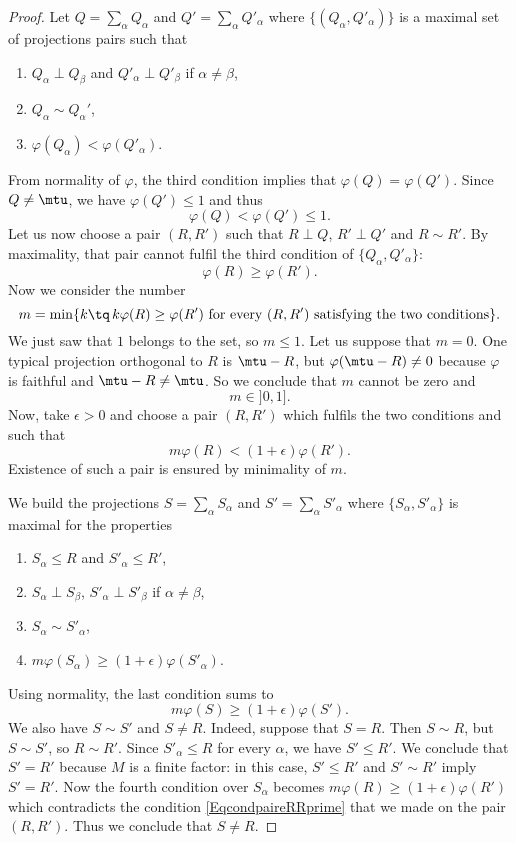 \begin{proof}
Let $Q=\sum_{\alpha}Q_{\alpha}$ and $Q'=\sum_{\alpha}Q'_{\alpha}$ where $\{ (Q_{\alpha},Q'_{\alpha}) \}$ is a maximal set of projections pairs such that
\begin{enumerate}
\item $Q_{\alpha}\perp Q_{\beta}$ and $Q'_{\alpha}\perp Q'_{\beta}$ if $\alpha\neq\beta$,
\item $Q_{\alpha}\sim Q_{\alpha}'$,
\item $\varphi(Q_{\alpha})<\varphi(Q'_{\alpha})$.
\end{enumerate}
From normality of $\varphi$, the third condition implies that $\varphi(Q)=\varphi(Q')$. Since $Q\neq\mtu$, we have $\varphi(Q')\leq 1$ and thus
\[ 
	\varphi(Q)<\varphi(Q')\leq 1.
\]
Let us now choose a pair $(R,R')$ such that $R\perp Q$, $R'\perp Q'$ and $R\sim R'$. By maximality, that pair cannot fulfil the third condition of $\{ Q_{\alpha},Q'_{\alpha} \}$:
\[ 
	\varphi(R)\geq \varphi(R').
\]
Now we consider the number
\begin{equation}
	m=\min\{ k\tq\, k\varphi(R)\geq\varphi(R')\text{ for every $(R,R')$ satisfying the two conditions} \}.
\end{equation}
We just saw that $1$ belongs to the set, so $m\leq 1$. Let us suppose that $m=0$. One typical projection orthogonal to $R$ is $\mtu-R$, but $\varphi(\mtu-R)\neq 0$ because $\varphi$ is faithful and $\mtu-R\neq\mtu$. So we conclude that $m$ cannot be zero and
\[ 
	m\in]0,1].
\]
Now, take $\epsilon>0$ and choose a pair $(R,R')$ which fulfils the two conditions and such that
\begin{equation}		\label{EqcondpaireRRprime}
	m\varphi(R)<(1+\epsilon)\varphi(R').
\end{equation}
Existence of such a pair is ensured by minimality of $m$.

We build the projections $S=\sum_{\alpha}S_{\alpha}$ and $S'=\sum_{\alpha}S'_{\alpha}$ where $\{ S_{\alpha},S'_{\alpha} \}$ is maximal for the properties
\begin{enumerate}
\item $S_{\alpha}\leq R$ and $S'_{\alpha}\leq R'$,
\item $S_{\alpha}\perp S_{\beta}$, $S'_{\alpha}\perp S'_{\beta}$ if $\alpha\neq\beta$,
\item $S_{\alpha}\sim S'_{\alpha}$,
\item $m\varphi(S_{\alpha})\geq (1+\epsilon)\varphi(S'_{\alpha})$.
\end{enumerate}
Using normality, the last condition sums to 
\begin{equation}
	m\varphi(S)\geq (1+\epsilon)\varphi(S').
\end{equation}
We also have $S\sim S'$ and $S\neq R$. Indeed, suppose that $S=R$. Then $S\sim R$, but $S\sim S'$, so $R\sim R'$. Since $S'_{\alpha}\leq R$ for every $\alpha$, we have $S'\leq R'$. We conclude that $S'=R'$ because $M$ is a finite factor: in this case, $S'\leq R'$ and $S'\sim R'$ imply $S'=R'$. Now the fourth condition over $S_{\alpha}$ becomes $m\varphi(R)\geq (1+\epsilon)\varphi(R')$ which contradicts the condition \eqref{EqcondpaireRRprime} that we made on the pair $(R,R')$. Thus we conclude that $S\neq R$.


\end{proof}
